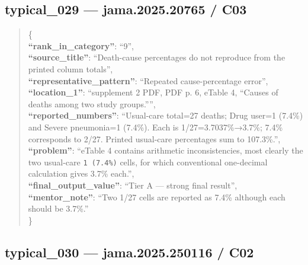 \documentclass[
  letterpaper,
  9pt]{extreport}
\begin{document}
\hypertarget{typical_029--jama202520765--c03}{%
\subsection{typical\_029 --- jama.2025.20765 /
C03}\label{typical_029--jama202520765--c03}}

\begin{quote}
\{\\
\textbf{``rank\_in\_category''}: ``9'',\\
\textbf{``source\_title''}: ``Death-cause percentages do not reproduce
from the printed column totals'',\\
\textbf{``representative\_pattern''}: ``Repeated cause-percentage
error'',\\
\textbf{``location\_1''}: ``supplement 2 PDF, PDF p. 6, eTable 4,
``Causes of deaths among two study groups.'''',\\
\textbf{``reported\_numbers''}: ``Usual-care total=27 deaths; Drug
user=1 (7.4\%) and Severe pneumonia=1 (7.4\%). Each is
1/27=3.7037\%→3.7\%; 7.4\% corresponds to 2/27. Printed usual-care
percentages sum to 107.3\%.'',\\
\textbf{``problem''}: ``eTable 4 contains arithmetic inconsistencies,
most clearly the two usual-care \texttt{1\ (7.4\%)} cells, for which
conventional one-decimal calculation gives 3.7\% each.'',\\
\textbf{``final\_output\_value''}: ``Tier A --- strong final result'',\\
\textbf{``mentor\_note''}: ``Two 1/27 cells are reported as 7.4\%
although each should be 3.7\%.''\\
\}
\end{quote}

\hypertarget{typical_030--jama2025250116--c02}{%
\subsection{typical\_030 --- jama.2025.250116 /
C02}\label{typical_030--jama2025250116--c02}}
\end{document}
